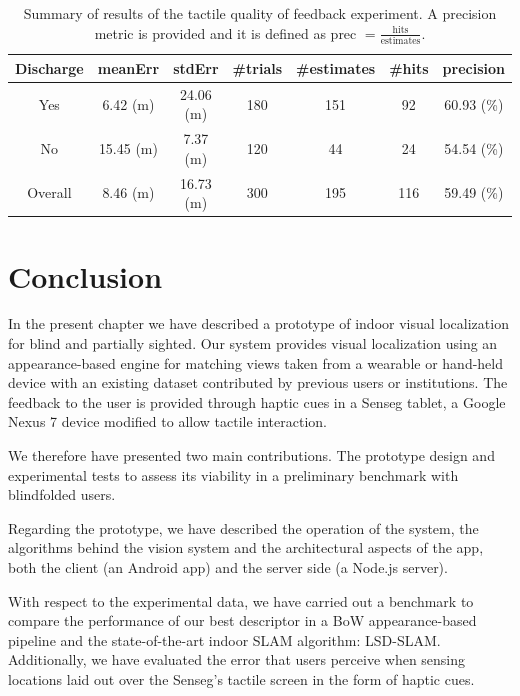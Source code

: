 \begin{table}
\centering
    \begin{tabular}{ccccccc}
     Discharge & meanErr & stdErr  & \#trials & \#estimates & \#hits & precision \\ \hline 
    Yes 			      &  6.42 (m)        & 24.06 (m)   & 180    & 151       & 92   & 60.93 (\%)     \\ \hline
    No  				  &  15.45 (m)      & 7.37 (m)  & 120    & 44        & 24   & 54.54 (\%)    \\ \hline
	Overall &  8.46 (m)   & 16.73 (m) & 300 & 195 & 116 & 59.49 (\%)  \\ \hline
    
    \end{tabular}
        \caption {Summary of results of the tactile quality of feedback experiment. A precision metric is provided and it is defined as prec $= \frac{\text{hits}}{\text{estimates}}$. }
\label{tab:sensegSummaries}
\end{table}



\section{Conclusion}
\label{sec:conclusion}

In the present chapter we have described a prototype of indoor visual localization for blind and partially sighted. Our system provides visual localization using an appearance-based engine for matching views taken from a wearable or hand-held device with an existing dataset contributed by previous users or institutions. The feedback to the user is provided through haptic cues in a Senseg tablet, a Google Nexus 7 device modified to allow tactile interaction.

We therefore have presented two main contributions. The prototype design and experimental tests to assess its viability in a preliminary benchmark with blindfolded users.

Regarding the prototype, we have described the operation of the system, the algorithms behind the vision system and the architectural aspects of the app, both the client (an Android app) and the server side (a Node.js server).

With respect to the experimental data, we have carried out a benchmark to compare the performance of our best descriptor in a BoW appearance-based pipeline and the state-of-the-art indoor SLAM algorithm: LSD-SLAM. Additionally, we have evaluated the error that users perceive when sensing locations laid out over the Senseg's tactile screen in the form of haptic cues.

